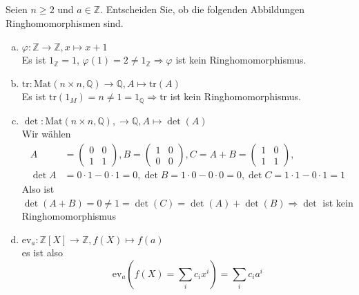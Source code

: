 \documentclass{article}
\newcommand{\Z}{\mathbb{Z}}
\newcommand{\Q}{\mathbb{Q}}
\newcommand{\tr}{\text{tr}}
\newcommand{\Mat}{\text{Mat}}
\newcommand{\ev}{\text{ev}}
\begin{document}
\subsection{}
\color{blue}
Seien $n\geq 2$ und $a\in\Z$. Entscheiden Sie, ob die
folgenden Abbildungen Ringhomomorphismen sind.
\color{black}
\begin{enumerate}[(a)]
    \item
        \color{blue}
        $\varphi:\Z\rightarrow\Z,x\mapsto x+1$\\
        \color{black}
        Es ist $1_\Z=1$, $\varphi(1)=2\neq 1_\Z\Rightarrow
        \varphi$ ist kein Ringhomomorphismus.
    \item
        \color{blue}
        $\tr:\Mat(n\times n,\Q)\rightarrow\Q,A\mapsto
        \tr(A)$\\
        \color{black}
        Es ist
        $\tr(1_M)=n\neq 1=1_\Q\Rightarrow\tr$ ist kein
        Ringhomomorphismus.
    \item
        \color{blue}
        $\det:\Mat(n\times n,\Q),\rightarrow\Q,
        A\mapsto\det(A)$\\
        \color{black}
        Wir wählen
        \begin{align*}
            A&=
            \begin{pmatrix}
                0&0\\
                1&1
            \end{pmatrix},
            B=
            \begin{pmatrix}
                1&0\\
                0&0
            \end{pmatrix},
            C=A+B=
            \begin{pmatrix}
                1&0\\
                1&1
            \end{pmatrix},\\
            \det A&=0\cdot1-0\cdot1=0,
            \det B=1\cdot0-0\cdot0=0,
            \det C=1\cdot1-0\cdot1=1
        \end{align*}
        Also ist $\det(A+B)=0\neq 1=\det(C)=\det(A)+\det(B)
        \Rightarrow\det$ ist kein Ringhomomorphismus
    \item
        \color{blue}
        $\ev_a:\Z[X]\rightarrow\Z,f(X)\mapsto f(a)$\\
        \color{black}
        es ist also
        \begin{equation*}
            \ev_a\left(f(X)=\sum_{i}c_ix^i\right)
            =\sum_{i}c_ia^i

\end{equation*}
\end{enumerate}
\end{document}

